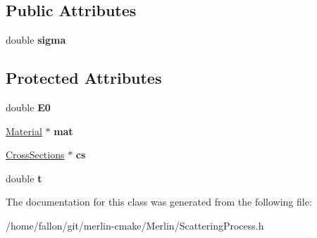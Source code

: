 \subsection*{Public Attributes}
\begin{DoxyCompactItemize}
\item 
\mbox{\label{classCollimation_1_1ScatteringProcess_ab58081f57b4aa3d6fa0f1b9f7630c376}} 
double {\bfseries sigma}
\end{DoxyCompactItemize}
\subsection*{Protected Attributes}
\begin{DoxyCompactItemize}
\item 
\mbox{\label{classCollimation_1_1ScatteringProcess_a92af4e74c4ef5f5c0342788e344fdb76}} 
double {\bfseries E0}
\item 
\mbox{\label{classCollimation_1_1ScatteringProcess_a67871724deeabbec616a5024db61b89a}} 
\hyperlink{classMaterial}{Material} $\ast$ {\bfseries mat}
\item 
\mbox{\label{classCollimation_1_1ScatteringProcess_a7f1a46f708b147d1c3d7afab7a5b556c}} 
\hyperlink{classCollimation_1_1CrossSections}{Cross\+Sections} $\ast$ {\bfseries cs}
\item 
\mbox{\label{classCollimation_1_1ScatteringProcess_a31e8e39bd17ab05591dec960bd1fcbea}} 
double {\bfseries t}
\end{DoxyCompactItemize}


The documentation for this class was generated from the following file\+:\begin{DoxyCompactItemize}
\item 
/home/fallon/git/merlin-\/cmake/\+Merlin/Scattering\+Process.\+h\end{DoxyCompactItemize}

